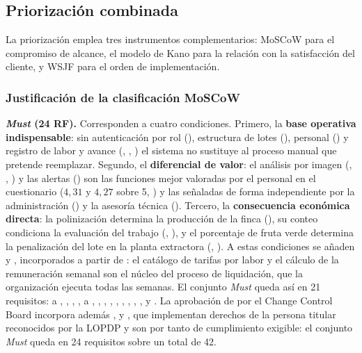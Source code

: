 \subsection{Priorización combinada}

La priorización emplea tres instrumentos complementarios: MoSCoW para el compromiso de alcance, el
modelo de Kano para la relación con la satisfacción del cliente, y WSJF para el orden de
implementación.

\subsubsection{Justificación de la clasificación MoSCoW}

\textbf{\emph{Must} (24 RF).} Corresponden a cuatro condiciones. Primero, la \textbf{base operativa
indispensable}: sin autenticación por rol (), estructura de lotes (), personal
() y registro de labor y avance (, , ) el sistema no
sustituye al proceso manual que pretende reemplazar. Segundo, el \textbf{diferencial de valor}: el
análisis por imagen (, , ) y las alertas () son las
funciones mejor valoradas por el personal en el cuestionario ($4{,}31$ y $4{,}27$ sobre 5,
) y las señaladas de forma independiente por la administración () y la asesoría
técnica (). Tercero, la \textbf{consecuencia económica directa}: la polinización determina
la producción de la finca (), su conteo condiciona la evaluación del trabajo
(, ), y el porcentaje de fruta verde determina la penalización del lote en la
planta extractora (, ). A estas condiciones se añaden  y ,
incorporados a partir de : el catálogo de tarifas por labor y el cálculo de la
remuneración semanal son el núcleo del proceso de liquidación, que la organización ejecuta todas las
semanas. El conjunto \emph{Must} queda así en 21 requisitos:  a , ,
, ,  a , , , , ,
, , , ,  y . La aprobación de
 por el Change Control Board incorpora además ,  y , que
implementan derechos de la persona titular reconocidos por la LOPDP y son por tanto de cumplimiento
exigible: el conjunto \emph{Must} queda en 24 requisitos sobre un total de 42.

